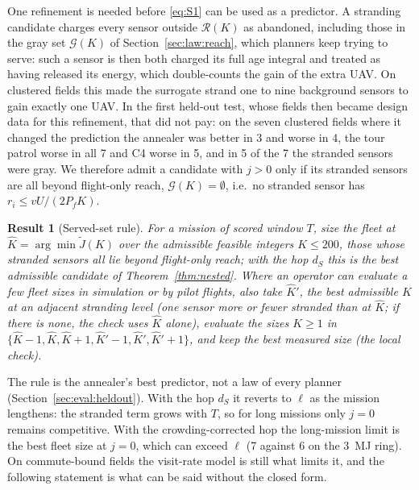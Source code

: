 \documentclass[journal,outdir=./]{IEEEtran}
\newtheorem{result}{Result}
\newcommand{\Pf}{P_{f}}
\begin{document}
One refinement is needed before \eqref{eq:S1} can be used as a predictor. A stranding candidate charges every sensor outside $\mathcal R(K)$ as abandoned, including those in the gray set $\mathcal G(K)$ of Section~\ref{sec:law:reach}, which planners keep trying to serve: such a sensor is then both charged its full age integral and treated as having released its energy, which double-counts the gain of the extra UAV. On clustered fields this made the surrogate strand one to nine background sensors to gain exactly one UAV. In the first held-out test, whose fields then became design data for this refinement, that did not pay: on the seven clustered fields where it changed the prediction the annealer was better in 3 and worse in 4, the tour patrol worse in all 7 and C4 worse in 5, and in 5 of the 7 the stranded sensors were gray. We therefore admit a candidate with $j>0$ only if its stranded sensors are all beyond flight-only reach, $\mathcal G(K)=\emptyset$, i.e.\ no stranded sensor has $r_i\le vU/(2\Pf K)$.

\begin{result}[Served-set rule]\label{res:served}
For a mission of scored window $T$, size the fleet at $\hat K=\arg\min\tilde J(K)$ over the admissible feasible integers $K\le200$, those whose stranded sensors all lie beyond flight-only reach; with the hop $d_S$ this is the best admissible candidate of Theorem~\ref{thm:nested}. Where an operator can evaluate a few fleet sizes in simulation or by pilot flights, also take $\hat K'$, the best admissible $K$ at an adjacent stranding level (one sensor more or fewer stranded than at $\hat K$; if there is none, the check uses $\hat K$ alone), evaluate the sizes $K\ge1$ in $\{\hat K-1,\hat K,\hat K+1,\hat K'-1,\hat K',\hat K'+1\}$, and keep the best measured size (the \emph{local check}).
\end{result}

The rule is the annealer's best predictor, not a law of every planner (Section~\ref{sec:eval:heldout}). With the hop $d_S$ it reverts to $\ell$ as the mission lengthens: the stranded term grows with $T$, so for long missions only $j=0$ remains competitive. With the crowding-corrected hop the long-mission limit is the best fleet size at $j=0$, which can exceed $\ell$ (7 against 6 on the 3~MJ ring). On commute-bound fields the visit-rate model is still what limits it, and the following statement is what can be said without the closed form.
\end{document}
